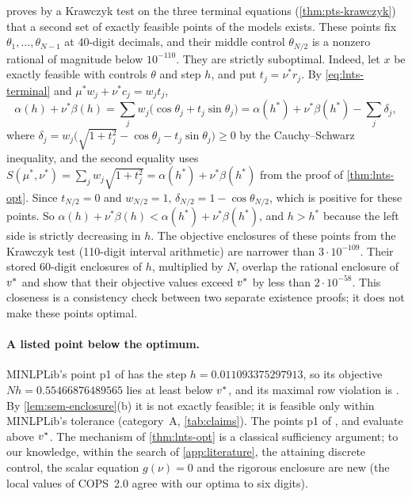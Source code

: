 \begin{remark}\label{rem:lnts-stored}
 proves by a Krawczyk test on the three terminal equations (\cref{thm:pts-krawczyk}) that a second set of exactly feasible points of the  models exists.
These points fix $\theta_1,\dots,\theta_{N-1}$ at 40-digit decimals, and their middle control $\theta_{N/2}$ is a nonzero rational of magnitude below $10^{-110}$.
They are strictly suboptimal.
Indeed, let $x$ be exactly feasible with controls $\theta$ and step $h$, and put $t_j=\nu^*r_j$.
By \eqref{eq:lnts-terminal} and $\mu^*w_j+\nu^*c_j=w_jt_j$,
\[
\alpha(h)+\nu^*\beta(h)=\sum_jw_j\bigl(\cos\theta_j+t_j\sin\theta_j\bigr)=\alpha(h^*)+\nu^*\beta(h^*)-\sum_j\delta_j,
\]
where $\delta_j=w_j\bigl(\sqrt{1+t_j^2}-\cos\theta_j-t_j\sin\theta_j\bigr)\ge0$ by the Cauchy--Schwarz inequality, and the second equality uses $S(\mu^*,\nu^*)=\sum_jw_j\sqrt{1+t_j^2}=\alpha(h^*)+\nu^*\beta(h^*)$ from the proof of \cref{thm:lnts-opt}.
Since $t_{N/2}=0$ and $w_{N/2}=1$, $\delta_{N/2}=1-\cos\theta_{N/2}$, which is positive for these points.
So $\alpha(h)+\nu^*\beta(h)<\alpha(h^*)+\nu^*\beta(h^*)$, and $h>h^*$ because the left side is strictly decreasing in $h$.
The objective enclosures of these points from the Krawczyk test (110-digit interval arithmetic) are narrower than $3\cdot10^{-109}$.
Their stored 60-digit enclosures of $h$, multiplied by $N$, overlap the rational enclosure of $v^{*}$ and show that their objective values exceed $v^{*}$ by less than $2\cdot10^{-58}$.
This closeness is a consistency check between two separate existence proofs; it does not make these points optimal.
\end{remark}

\paragraph{A listed point below the optimum.}
MINLPLib's point p1 of  has the step $h=0.011093375297913$, so its objective $Nh=0.55466876489565$ lies at least  below $v^{*}$, and its maximal row violation is .
By \cref{lem:sem-enclosure}(b) it is not exactly feasible; it is feasible only within MINLPLib's tolerance (category~A, \cref{tab:claims}).
The points p1 of ,  and  evaluate above $v^{*}$.
The mechanism of \cref{thm:lnts-opt} is a classical sufficiency argument; to our knowledge, within the search of \cref{app:literature}, the attaining discrete control, the scalar equation $g(\nu)=0$ and the rigorous enclosure are new (the local values of COPS~2.0 agree with our optima to six digits).

